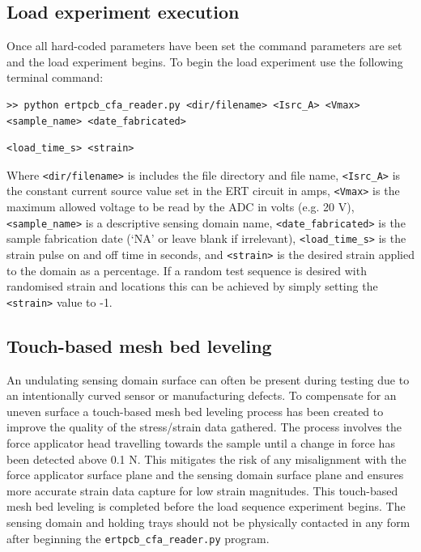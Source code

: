 \subsection{Load experiment execution}
Once all hard-coded parameters have been set the command parameters are set and the load experiment begins. To begin the load experiment use the following terminal command:
\begin{verbatim}
>> python ertpcb_cfa_reader.py <dir/filename> <Isrc_A> <Vmax> <sample_name> <date_fabricated>
\end{verbatim}
\vspace{-1cm}
\begin{verbatim}
<load_time_s> <strain>
\end{verbatim}

Where \verb|<dir/filename>| is includes the file directory and file name, \verb|<Isrc_A>| is the constant current source value set in the ERT circuit in amps, \verb|<Vmax>| is the maximum allowed voltage to be read by the ADC in volts (e.g. 20 V), \verb|<sample_name>| is a descriptive sensing domain name, \verb|<date_fabricated>| is the sample fabrication date (`NA' or leave blank if irrelevant), \verb|<load_time_s>| is the strain pulse on and off time in seconds, and \verb|<strain>| is the desired strain applied to the domain as a percentage. If a random test sequence is desired with randomised strain and locations this can be achieved by simply setting the \verb|<strain>| value to -1.


\subsection{Touch-based mesh bed leveling}
An undulating sensing domain surface can often be present during testing due to an intentionally curved sensor or manufacturing defects. To compensate for an uneven surface a touch-based mesh bed leveling process has been created to improve the quality of the stress/strain data gathered. The process involves the force applicator head travelling towards the sample until a change in force has been detected above 0.1 N. This mitigates the risk of any misalignment with the force applicator surface plane and the sensing domain surface plane and ensures more accurate strain data capture for low strain magnitudes. This touch-based mesh bed leveling is completed before the load sequence experiment begins. The sensing domain and holding trays should not be physically contacted in any form after beginning the \verb|ertpcb_cfa_reader.py| program.


